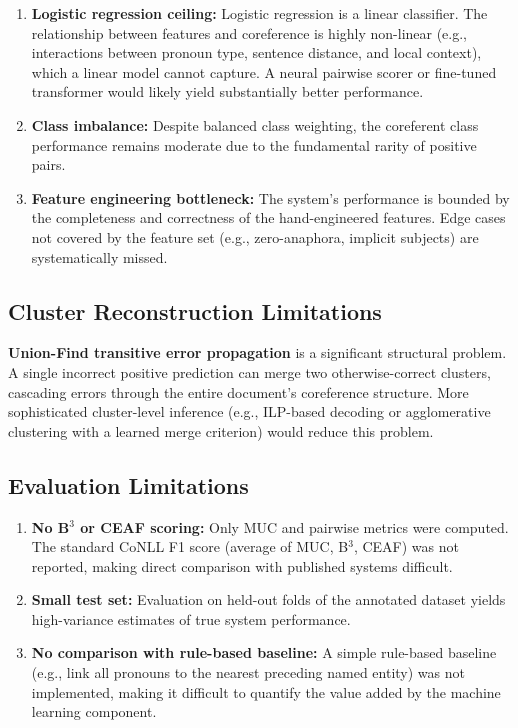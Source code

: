 \documentclass[12pt,a4paper]{report}
\begin{document}
\begin{enumerate}
    \item \textbf{Logistic regression ceiling:} Logistic regression is a linear classifier. The relationship between features and coreference is highly non-linear (e.g., interactions between pronoun type, sentence distance, and local context), which a linear model cannot capture. A neural pairwise scorer or fine-tuned transformer would likely yield substantially better performance.
    \item \textbf{Class imbalance:} Despite balanced class weighting, the coreferent class performance remains moderate due to the fundamental rarity of positive pairs.
    \item \textbf{Feature engineering bottleneck:} The system's performance is bounded by the completeness and correctness of the hand-engineered features. Edge cases not covered by the feature set (e.g., zero-anaphora, implicit subjects) are systematically missed.
\end{enumerate}

\subsection{Cluster Reconstruction Limitations}

\textbf{Union-Find transitive error propagation} is a significant structural problem. A single incorrect positive prediction can merge two otherwise-correct clusters, cascading errors through the entire document's coreference structure. More sophisticated cluster-level inference (e.g., ILP-based decoding or agglomerative clustering with a learned merge criterion) would reduce this problem.

\subsection{Evaluation Limitations}

\begin{enumerate}
    \item \textbf{No B$^3$ or CEAF scoring:} Only MUC and pairwise metrics were computed. The standard CoNLL F1 score (average of MUC, B$^3$, CEAF) was not reported, making direct comparison with published systems difficult.
    \item \textbf{Small test set:} Evaluation on held-out folds of the annotated dataset yields high-variance estimates of true system performance.
    \item \textbf{No comparison with rule-based baseline:} A simple rule-based baseline (e.g., link all pronouns to the nearest preceding named entity) was not implemented, making it difficult to quantify the value added by the machine learning component.
\end{enumerate}
\end{document}
